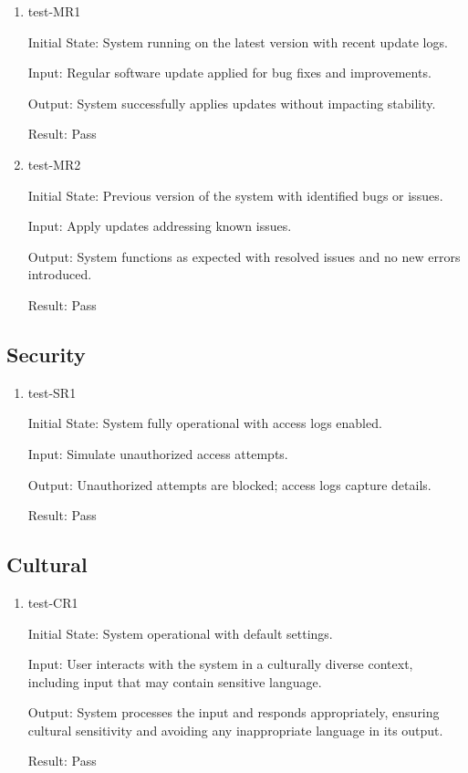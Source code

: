\documentclass[12pt, titlepage]{article}
\begin{document}
\begin{enumerate}
\item test-MR1 \label{test-MR1}

Initial State: System running on the latest version with recent update logs.

Input: Regular software update applied for bug fixes and improvements.

Output: System successfully applies updates without impacting stability.

Result: Pass

\item test-MR2 \label{test-MR2} 

Initial State: Previous version of the system with identified bugs or issues.

Input: Apply updates addressing known issues.

Output: System functions as expected with resolved issues and no new errors introduced.

Result: Pass

\end{enumerate}

\subsection{Security} \label{section:4.6}

\begin{enumerate}
\item test-SR1 \label{test-SR1}

Initial State: System fully operational with access logs enabled.

Input: Simulate unauthorized access attempts.

Output: Unauthorized attempts are blocked; access logs capture details.

Result: Pass

\end{enumerate}

\subsection{Cultural} \label{section:4.7}

\begin{enumerate}
\item test-CR1 \label{test-CR1} 

Initial State: System operational with default settings.

Input: User interacts with the system in a culturally diverse context, including input that may contain sensitive language.

Output: System processes the input and responds appropriately, ensuring cultural sensitivity and avoiding any inappropriate language in its output.

Result: Pass

\end{enumerate}
\end{document}
